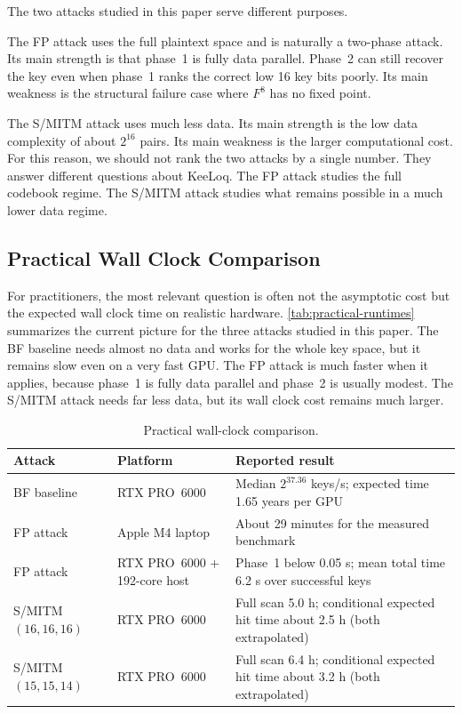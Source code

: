 \documentclass[version=preprint]{iacrcc}
\begin{document}
The two attacks studied in this paper serve different purposes.

The FP attack uses the full plaintext space and is naturally a two-phase attack.
Its main strength is that phase~1 is fully data parallel.
Phase~2 can still recover the key even when phase~1 ranks the correct low 16 key bits poorly.
Its main weakness is the structural failure case where $F^8$ has no fixed point.

The S/MITM attack uses much less data.
Its main strength is the low data complexity of about $2^{16}$ pairs.
Its main weakness is the larger computational cost.
For this reason, we should not rank the two attacks by a single number.
They answer different questions about KeeLoq.
The FP attack studies the full codebook regime.
The S/MITM attack studies what remains possible in a much lower data regime.

\subsection{Practical Wall Clock Comparison}

For practitioners, the most relevant question is often not the asymptotic cost but the expected wall clock time on realistic hardware.
\autoref{tab:practical-runtimes} summarizes the current picture for the three attacks studied in this paper.
The BF baseline needs almost no data and works for the whole key space, but it remains slow even on a very fast GPU.
The FP attack is much faster when it applies, because phase~1 is fully data parallel and phase~2 is usually modest.
The S/MITM attack needs far less data, but its wall clock cost remains much larger.

\begin{table}[htbp]
  \centering
  \footnotesize
  \caption{Practical wall-clock comparison.}
  \label{tab:practical-runtimes}
  \setlength{\tabcolsep}{4pt}
  \renewcommand{\arraystretch}{1.05}
  \begin{tabular}{@{}>{\raggedright\arraybackslash}p{2.5cm}>{\raggedright\arraybackslash}p{2.2cm}>{\raggedright\arraybackslash}p{4.9cm}@{}}
    \toprule
    Attack & Platform & Reported result \\
    \midrule
    BF baseline &
    RTX PRO~6000 &
    Median $2^{37.36}$ keys/s; expected time 1.65 years per GPU \\
    \addlinespace
    FP attack &
    Apple M4 laptop &
    About 29 minutes for the measured benchmark \\
    \addlinespace
    FP attack &
    RTX PRO~6000 + 192-core host &
    Phase~1 below 0.05 s; mean total time 6.2 s over successful keys \\
    \addlinespace
    S/MITM $(16,16,16)$ &
    RTX PRO~6000 &
    Full scan 5.0 h; conditional expected hit time about 2.5 h (both extrapolated) \\
    \addlinespace
    S/MITM $(15,15,14)$ &
    RTX PRO~6000 &
    Full scan 6.4 h; conditional expected hit time about 3.2 h (both extrapolated) \\
    \bottomrule
  \end{tabular}
\end{table}
\end{document}
